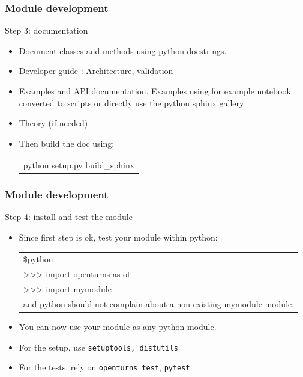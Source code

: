 \documentclass[8pt]{beamer}
\begin{document}
\begin{frame}
  \frametitle{Module development}
  \begin{block}{Step 3: documentation}

    \begin{itemize}
      \item Document classes and methods using python docstrings.
      \item Developer guide : Architecture, validation
      \item Examples and API documentation. Examples using for example notebook converted to scripts
      or directly use the python sphinx gallery
      \item Theory (if needed)
      \item Then build the doc using:
      \begin{tabular}{l}
        \ttfamily python setup.py build\_sphinx
      \end{tabular}
    \end{itemize}
  \end{block}
\end{frame}


\begin{frame}
  \frametitle{Module development}
  \begin{block}{Step 4: install and test the module}
    \begin{itemize}
    \item Since first step is ok, test your module within python:\\
      \begin{tabular}{l}
        \ttfamily \$python \\
        \ttfamily >>> import openturns as ot \\
        \ttfamily >>> import mymodule \\
      and python should not complain about a non existing mymodule module.
      \end{tabular}
      \item You can now use your module as any python module.
      \item For the setup, use \texttt{setuptools, distutils} 
      \item For the tests, rely on \texttt{openturns test}, \texttt{pytest} 
    \end{itemize}
  \end{block}
\end{frame}
\end{document}
